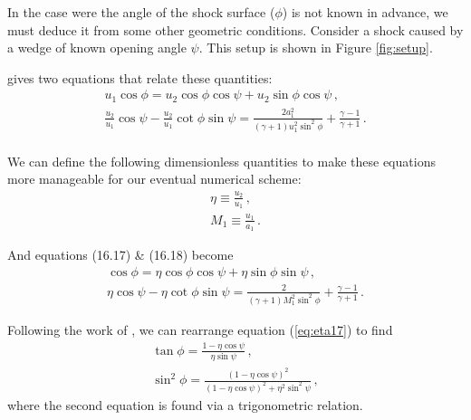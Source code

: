 \documentclass[twocolumn]{aastex631}
\begin{document}
In the case were the angle of the shock surface ($\phi$) is not known in advance, we must deduce it from some other geometric conditions. Consider a shock caused by a wedge of known opening angle $\psi$. This setup is shown in Figure \ref{fig:setup}.

\citet{shu} gives two equations that relate these quantities:
\begin{align*}
    u_1 \cos\phi = u_2 \cos\phi \cos\psi + u_2 \sin\phi \cos\psi \, , \tag{16.17}\\
    \frac{u_2}{u_1}\cos\psi - \frac{u_2}{u_1}\cot\phi\sin\psi = \frac{2 a_1^2}{(\gamma + 1) u_1^2 \sin^2\phi} + \frac{\gamma -1}{\gamma + 1}\, . \tag{16.18}\\
\end{align*}

We can define the following dimensionless quantities to make these equations more manageable for our eventual numerical scheme:
\begin{align}
    \eta \equiv \frac{u_2}{u_1}\, , \\
    M_1 \equiv \frac{u_1}{a_1}\, .
\end{align}

And equations (16.17) \& (16.18) become
\begin{align}
    \cos\phi = \eta\cos\phi\cos\psi + \eta\sin\phi\sin\psi\, , \label{eq:eta17} \\
    \eta\cos\psi - \eta\cot\phi\sin\psi = \frac{2}{(\gamma + 1)M_1^2 \sin^2\phi} + \frac{\gamma-1}{\gamma + 1}\, . \label{eq:eta18}
\end{align}

Following the work of \citet[Ch. 16]{shu}, we can rearrange equation (\ref{eq:eta17}) to find
\begin{align}
    \tan\phi = \frac{1-\eta\cos\psi}{\eta\sin\psi}\, , \label{eq:tanphi}\\
    \sin^2\phi = \frac{(1-\eta\cos\psi)^2}{(1-\eta\cos\psi)^2+\eta^2\sin^2\psi}\, , \label{eq:sinsqphi}
\end{align}
where the second equation is found via a trigonometric relation.
\end{document}
